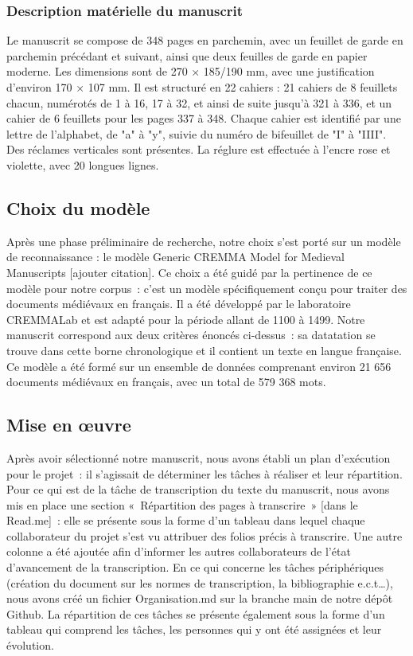 \documentclass[12pt,a4paper,oneside,titlepage]{article} %
\begin{document}
\subsubsection{Description matérielle du manuscrit}
Le manuscrit se compose de 348 pages en parchemin, avec un feuillet de garde en parchemin précédant et suivant, ainsi que deux feuilles de garde en papier moderne. Les dimensions sont de 270 × 185/190 mm, avec une justification d'environ 170 × 107 mm. Il est structuré en 22 cahiers : 21 cahiers de 8 feuillets chacun, numérotés de 1 à 16, 17 à 32, et ainsi de suite jusqu'à 321 à 336, et un cahier de 6 feuillets pour les pages 337 à 348. Chaque cahier est identifié par une lettre de l'alphabet, de "a" à "y", suivie du numéro de bifeuillet de "I" à "IIII". Des réclames verticales sont présentes. La réglure est effectuée à l'encre rose et violette, avec 20 longues lignes.
\subsection{Choix du modèle}
Après une phase préliminaire de recherche, notre choix s'est porté sur un modèle de reconnaissance : le modèle Generic CREMMA Model for Medieval Manuscripts [ajouter citation]. Ce choix a été guidé par la pertinence de ce modèle pour notre corpus : c’est un modèle spécifiquement conçu pour traiter des documents médiévaux en français. Il a été développé par le laboratoire CREMMALab et est adapté pour la période allant de 1100 à 1499. Notre manuscrit correspond aux deux critères énoncés ci-dessus : sa datatation se trouve dans cette borne chronologique et il contient un texte en langue française. Ce modèle a été formé sur un ensemble de données comprenant environ 21 656 documents médiévaux en français, avec un total de 579 368 mots.
\subsection{Mise en œuvre}
Après avoir sélectionné notre manuscrit, nous avons établi un plan d'exécution pour le projet : il s’agissait de déterminer les tâches à réaliser et leur répartition. Pour ce qui est de la tâche de transcription du texte du manuscrit, nous avons mis en place une section « Répartition des pages à transcrire » [dans le Read.me] : elle se présente sous la forme d’un tableau dans lequel chaque collaborateur du projet s’est vu attribuer des folios précis à transcrire. Une autre colonne a été ajoutée afin d’informer les autres collaborateurs de l’état d’avancement de la transcription. En ce qui concerne les tâches périphériques (création du document sur les normes de transcription, la bibliographie e.c.t…),  nous avons créé un fichier Organisation.md sur la branche main de notre dépôt Github. La répartition de ces tâches se présente également sous la forme d’un tableau qui comprend les tâches, les personnes qui y ont été assignées et leur évolution.
\end{document}

